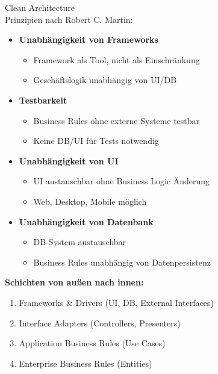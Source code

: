 \begin{KR}{Clean Architecture}\\
Prinzipien nach Robert C. Martin:

\begin{itemize}
    \item \textbf{Unabhängigkeit von Frameworks}
    \begin{itemize}
        \item Framework als Tool, nicht als Einschränkung
        \item Geschäftslogik unabhängig von UI/DB
    \end{itemize}
    
    \item \textbf{Testbarkeit}
    \begin{itemize}
        \item Business Rules ohne externe Systeme testbar
        \item Keine DB/UI für Tests notwendig
    \end{itemize}
    
    \item \textbf{Unabhängigkeit von UI}
    \begin{itemize}
        \item UI austauschbar ohne Business Logic Änderung
        \item Web, Desktop, Mobile möglich
    \end{itemize}
    
    \item \textbf{Unabhängigkeit von Datenbank}
    \begin{itemize}
        \item DB-System austauschbar
        \item Business Rules unabhängig von Datenpersistenz
    \end{itemize}
\end{itemize}

\textbf{Schichten von außen nach innen:}
\begin{enumerate}
    \item Frameworks \& Drivers (UI, DB, External Interfaces)
    \item Interface Adapters (Controllers, Presenters)
    \item Application Business Rules (Use Cases)
    \item Enterprise Business Rules (Entities)
\end{enumerate}
\end{KR}



